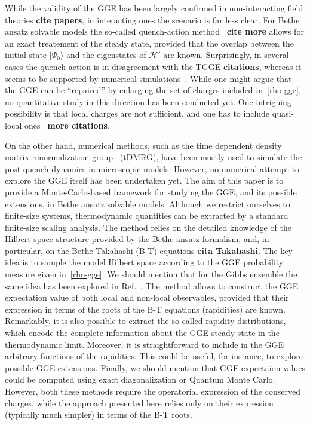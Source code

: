\documentclass[twocolumn,superscriptaddress,prb,10pt]{revtex4-1}
\begin{document}
While the validity of the GGE 
has been largely confirmed in non-interacting field theories {\bf cite papers}, 
in interacting ones the scenario is far less clear. For Bethe ansatz solvable models 
the so-called quench-action method~\cite{caux-2013} {\bf cite more} allows for an 
exact treatement of the steady state, provided that the overlap between the initial 
state $|\Psi_0\rangle$ and the eigenstates of ${\mathcal H}'$ are known. Surprisingly, 
in several cases the quench-action is in disagreement with the TGGE {\bf citations}, 
whereas it seems to be supported by numerical simulations~\cite{pozsgay-2014}. 
While one might argue that the GGE can be ``repaired'' by enlarging the set of 
charges included in~\eqref{rho-gge}, 
no quantitative study in this direction has been conducted yet. One intriguing 
possibility is that local charges are not sufficient, and one has to include 
quasi-local ones~\cite{ilievski-2015} {\bf more citations}. 

On the other hand, numerical methods, such as the time dependent density 
matrix renormalization group~\cite{white-2004,daley-2004} (tDMRG), have been mostly 
used to simulate the post-quench dynamics in microscopic models. However, no numerical 
attempt to explore the GGE itself has been undertaken yet. The aim of this paper is to 
provide a Monte-Carlo-based framework for studying  the GGE, and its possible extensions,   
in Bethe ansatz solvable models. Although we restrict ourselves to finite-size systems, 
thermodynamic quantities can be extracted by a standard finite-size scaling analysis.  
The method relies on the detailed knowledge of the Hilbert space structure provided by 
the Bethe ansatz formalism, and, in particular, on the Bethe-Takahashi (B-T) equations {\bf cita 
Takahashi}. The key idea is to sample the model Hilbert space according to the GGE 
probability measure given in~\eqref{rho-gge}. We should mention that for the Gibbs 
ensemble the same idea has been explored in Ref.~.
The method allows to construct the GGE expectation value of both local and non-local 
observables, provided that their expression in terms of the roots of 
the B-T equations (rapidities) are known. Remarkably, it is also possible to extract 
the so-called rapidity distributions, which encode the complete information about the 
GGE steady state in the thermodynamic limit. Moreover, it is straightforward to include 
in the GGE arbitrary functions of the rapidities. This could be useful, for instance, 
to explore possible GGE extensions.   
Finally, we should mention that GGE expectaion values could be computed using exact 
diagonalization or Quantum Monte Carlo. However, both these methods require the 
operatorial expression of the conserved charges, while the approach presented here 
relies only on their expression (typically much simpler) in terms of the B-T roots. 
\end{document}
